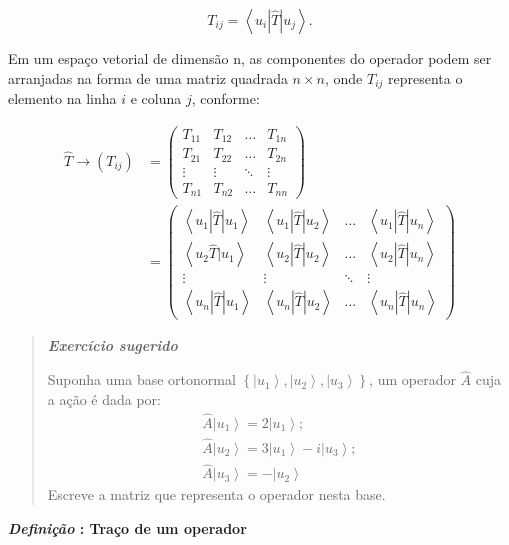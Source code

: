 \documentclass[11pt]{article}
\begin{document}
\[
T_{i j}=\left\langle u_{i}|\hat{T}| u_{j}\right\rangle.
\]

Em um espaço vetorial de dimensão n, as componentes do operador podem
ser arranjadas na forma de uma matriz quadrada \(n \times n\), onde
\(T_{i j}\) representa o elemento na linha \(i\) e coluna \(j\),
conforme:

\[
\begin{aligned}
\hat{T} \rightarrow\left(T_{i j}\right) &=\left(\begin{array}{cccc}
T_{11} & T_{12} & \dots & T_{1 n} \\
T_{21} & T_{22} & \dots & T_{2 n} \\
\vdots & \vdots & \ddots & \vdots \\
T_{n 1} & T_{n 2} & \dots & T_{n n}
\end{array}\right) \\
&=\left(\begin{array}{cccc}
\left\langle u_{1}|\hat{T}| u_{1}\right\rangle & \left\langle u_{1}|\hat{T}| u_{2}\right\rangle & \dots & \left\langle u_{1}|\hat{T}| u_{n}\right\rangle \\
\left\langle u_{2} \hat{T} | u_{1}\right\rangle & \left\langle u_{2}|\hat{T}| u_{2}\right\rangle & \dots & \left\langle u_{2}|\hat{T}| u_{n}\right\rangle \\
\vdots & \vdots & \ddots & \vdots \\
\left\langle u_{n}|\hat{T}| u_{1}\right\rangle & \left\langle u_{n}|\hat{T}| u_{2}\right\rangle & \dots & \left\langle u_{n}|\hat{T}| u_{n}\right\rangle
\end{array}\right)
\end{aligned}
\]

\begin{quote}
\textbf{\emph{Exercício sugerido}}

Suponha uma base ortonormal
\(\left\{\left|u_{1}\right\rangle,\left|u_{2}\right\rangle,\left|u_{3}\right\rangle\right\}\),
um operador \(\hat{A}\) cuja a ação é dada por: \[
\begin{array}{l}
\hat{A}\left|u_{1}\right\rangle=2\left|u_{1}\right\rangle; \\
\hat{A}\left|u_{2}\right\rangle=3\left|u_{1}\right\rangle-i\left|u_{3}\right\rangle; \\
\hat{A}\left|u_{3}\right\rangle=-\left|u_{2}\right\rangle
\end{array}
\] Escreve a matriz que representa o operador nesta base.
\end{quote}

    \textbf{\emph{Definição} : Traço de um operador}
\end{document}

